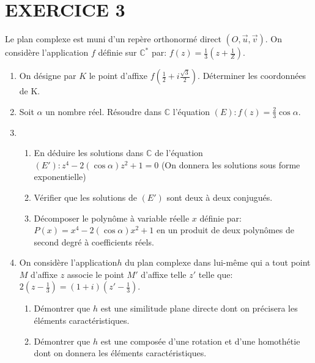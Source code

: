 \documentclass[13pts]{report}
\begin{document}
	\section*{EXERCICE 3}
		Le plan complexe est muni d'un repère orthonormé direct $(O,\overrightarrow{u},\overrightarrow{v})$. On considère l'application $f$ définie sur $\mathbb{C}^*$ par: $f(z)=\frac{1}{3}(z+\frac{1}{Z})$.
		\begin{enumerate}
			\item On désigne par $K$ le point d'affixe $f(\frac{1}{2}+i\frac{\sqrt{3}}{2})$. Déterminer les coordonnées de K.
			\item Soit $\alpha$ un nombre réel. Résoudre dans $\mathbb{C}$ l'équation $(E): f(z)=\frac{2}{3}\cos \alpha$.
			\item 
				\begin{enumerate}
					\item En déduire les solutions dans $\mathbb{C}$ de l'équation $(E'): z^4-2(\cos \alpha)z^2+1=0$ (On donnera les solutions sous forme exponentielle)
					\item Vérifier que les solutions de $(E')$ sont deux à deux conjugués.
					\item Décomposer le polynôme à variable réelle $x$ définie par: $P(x)=x^4-2(\cos \alpha )x^2+1$ en  un produit de deux polynômes de second degré à coefficients réels.
				\end{enumerate} 
			\item	On considère l'application$h$ du plan complexe dans lui-même qui a tout point $M$ d'affixe $z$ associe le point $M'$ d'affixe telle $z'$ telle que: $2(z-\frac{1}{3})=(1+i)(z'-\frac{1}{3})$.
				\begin{enumerate}
					\item  Démontrer que $h$ est une similitude plane directe dont on précisera les éléments caractéristiques.
					\item Démontrer que $h$ est une composée d'une rotation et d'une homothétie dont on donnera les éléments caractéristiques.
				\end{enumerate}
		
		\end{enumerate}
	
\end{document}

